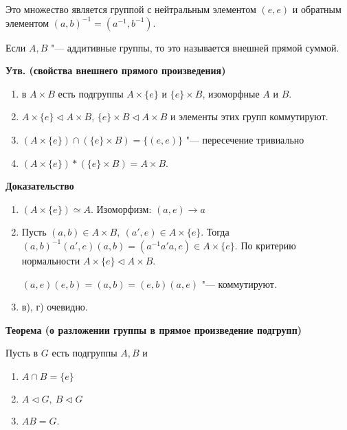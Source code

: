 \documentclass{article}
\begin{document}
Это множество является группой с нейтральным элементом $(e,e)$ и обратным элементом $(a, b)^{-1} = (a^{-1}, b^{-1})$.

Если $A, B$ "--- аддитивные группы, то это называется внешней прямой суммой.

\vspace{10pt}

\textbf{Утв. (свойства внешнего прямого произведения)}
\begin{enumerate}
	\item в $A \times B$ есть подгруппы $A \times \{e\}$ и $\{e\} \times B$, изоморфные $A$ и $B$.
	
	\item $A \times \{e\} \triangleleft A \times B$, $\{e\} \times B \triangleleft A \times B$ и элементы этих групп коммутируют.
	
	\item $(A \times \{e\}) \cap (\{e\} \times B) = \{(e, e)\}$ "--- пересечение тривиально
	
	\item $(A \times \{e\}) * (\{e\} \times B) = A \times B$.
\end{enumerate}

\vspace{5pt}

\textbf{Доказательство}
\begin{enumerate}
	\item $(A \times \{e\}) \simeq A$. Изоморфизм: $(a, e) \rightarrow a$
	\item Пусть $(a, b) \in A \times B, \  (a', e) \in A \times \{e\}$. Тогда $(a, b)^{-1}(a', e)(a, b) = (a^{-1}a'a, e) \in A \times \{e\}$. По критерию нормальности $A \times \{e\} \triangleleft A \times B$.
	
	$(a, e)(e, b) = (a, b) = (e, b)(a, e)$ "--- коммутируют.
	
	\item в), г) очевидно.
\end{enumerate}

\vspace{10pt}

\textbf{Теорема (о разложении группы в прямое произведение подгрупп)}

Пусть в $G$ есть подгруппы $A, B$ и
\begin{enumerate}
	\item $A \cap B = \{e\}$
	\item $A \triangleleft G, \  B \triangleleft G$
	\item $AB = G$.
\end{enumerate}
\end{document}
